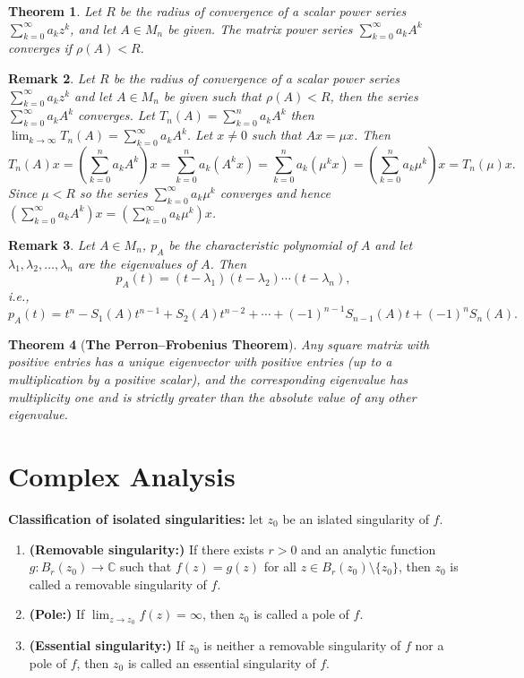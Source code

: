 \documentclass[answers, a4paper, 12pt]{exam}
\newtheorem{theorem}{Theorem}[section]
\newtheorem{remark}[theorem]{Remark}
\newcommand{\C}{\mathbb{C}}
\begin{document}
\begin{theorem}\label{thm5}
    Let $R$ be the radius of convergence of a scalar power series $\sum_{k=0}^{\infty}{a_kz^k}$, and let $A\in M_n$ be given. The matrix power series $\sum_{k=0}^{\infty}{a_kA^k}$ converges if $\rho(A)<R$.
\end{theorem}
\begin{remark}
    Let $R$ be the radius of convergence of a scalar power series $\sum_{k=0}^{\infty}{a_kz^k}$ and let $A\in M_n$ be given such that $\rho(A)<R$, then the series $\sum_{k=0}^{\infty}{a_kA^k}$ converges. Let $T_n(A)=\sum_{k=0}^{n}{a_kA^k}$ then $\lim_{k\to\infty}{T_n}(A)=\sum_{k=0}^{\infty}{a_kA^k}$. Let $x\neq 0$ such that $Ax=\mu x$. Then $$T_n(A)x=\left(\sum_{k=0}^{n}{a_kA^k}\right)x=\sum_{k=0}^{n}{a_k(A^kx)}=\sum_{k=0}^{n}{a_k(\mu^kx)}=\left(\sum_{k=0}^{n}{a_k\mu^k}\right)x=T_n(\mu)x.$$
    Since $\mu<R$ so the series $\sum_{k=0}^{\infty}{a_k\mu^k}$ converges and hence $\left(\sum_{k=0}^{\infty}{a_kA^k}\right)x=\left(\sum_{k=0}^{\infty}{a_k\mu^k}\right)x$.
\end{remark}
\begin{remark}
    Let $A\in M_n$, $p_A$ be the characteristic polynomial of $A$ and let $\lambda_1, \lambda_2, \ldots, \lambda_n$ are the eigenvalues of $A$. Then $$p_A(t)=(t-\lambda_1)(t-\lambda_2)\cdots(t-\lambda_n),$$
    i.e., $$p_A(t)=t^n-S_1(A)t^{n-1}+S_2(A)t^{n-2}+\cdots+(-1)^{n-1}S_{n-1}(A)t+(-1)^nS_n(A).$$
\end{remark}

\begin{theorem}[\textbf{The Perron–Frobenius Theorem}]
    Any square matrix with positive entries has a unique eigenvector with positive entries (up to a multiplication by a positive scalar), and the corresponding eigenvalue has multiplicity one and is strictly greater than the absolute value of any other eigenvalue.
\end{theorem}

\newpage
\section{Complex Analysis}

\textbf{Classification of isolated singularities: } let $z_0$ be an islated singularity of $f$.
\begin{enumerate}\justifying
    \item \textbf{(Removable singularity:)} If there exists $r>0$ and an analytic function $g:B_{r}{(z_0)}\to\C$ such that $f(z)=g(z)$ for all $z\in B_{r}{(z_0)}\setminus\{z_0\}$, then $z_0$ is called a removable singularity of $f$.
    \item \textbf{(Pole:)} If $\displaystyle\lim_{z\to z_0}{f(z)}=\infty$, then $z_0$ is called a pole of $f$.
    \item \textbf{(Essential singularity:)} If $z_0$ is neither a removable singularity of $f$ nor a pole of $f$, then $z_0$ is called an essential singularity of $f$.
\end{enumerate}
\end{document}
